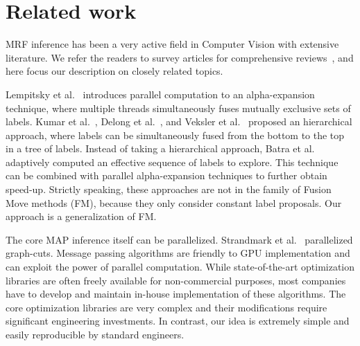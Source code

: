 \section{Related work}


MRF inference has been a very active field in Computer Vision with
extensive literature. We refer the readers to survey articles for
comprehensive
reviews~\cite{middlebury_mrf,comparative_study_of_modern_inference}, and
here focus our description on closely related topics.


\noindent Lempitsky et al.~\cite{fusion_moves_for_markov_random_field_optimization} introduces parallel computation to an
alpha-expansion technique, where multiple threads simultaneously fuses
mutually exclusive sets of labels. Kumar et
al.~\cite{hierarchical_graph_cuts_kumar_and_koller}, Delong et
al.~\cite{delong_hierarchical_fusion}, and Veksler et al.~\cite{olga_hierarchical_alpha_expansion} proposed an hierarchical
approach, where labels can be simultaneously fused from the bottom to
the top in a tree of labels. 
% 
Instead of taking a hierarchical approach, Batra et
al.~\cite{Dhruv_pushmeet_making_the_right_move} adaptively computed an
effective sequence of labels to explore. This technique can be combined
with parallel alpha-expansion techniques to further obtain speed-up.
%
Strictly speaking, these approaches are not in the family of Fusion Move
methods (FM), because they only consider constant label proposals. Our
approach is a generalization of FM.



\noindent The core MAP inference itself can be parallelized.  Strandmark
et al.~\cite{strandmark_parallel} parallelized graph-cuts.
%
Message passing algorithms are friendly to GPU implementation and can
exploit the power of parallel computation.
%
%
While state-of-the-art optimization libraries are often freely available
for non-commercial purposes, most companies have to develop and maintain
in-house implementation of these algorithms.  The core optimization
libraries are very complex and their modifications require significant
engineering investments. In contrast, our idea is extremely simple and
easily reproducible by standard engineers.





